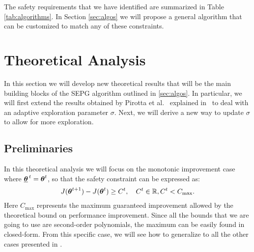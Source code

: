 \begin{samepage}
\begin{table}
	\caption{Overview of the safety requirements outlined in Section \ref{sec:framework}.}\label{tab:algorithms}
\end{table}

The safety requirements that we have identified are summarized in Table \ref{tab:algorithms}. In 
Section \ref{sec:algos} we will propose a general algorithm that can be customized to match any of these constraints.
\end{samepage}

\section{Theoretical Analysis}\label{sec:theory}
In this section we will develop new theoretical results that will be the main building blocks of the SEPG algorithm outlined in \ref{sec:algos}. In particular, we will first extend the results obtained by Pirotta et al.~\cite{adaptive_step} explained in~ to deal with an adaptive exploration parameter $\sigma$. Next, we will derive a new way to update $\sigma$ to allow for more exploration. 

\subsection{Preliminaries}

In this theoretical analysis we will focus on the monotonic improvement case where ${\underline{{\boldsymbol{\theta}}}^{\,t}}={\boldsymbol{\theta}}^t$, so that the safety constraint can be expressed as:
%
\begin{align*}
J({\boldsymbol{\theta}}^{t+1}) - J({\boldsymbol{\theta}}^t) \geq C^t, \quad C^t \in \mathbb{R}, C^t < C_{\text{max}}.
\end{align*}
Here $C_\text{max}$ represents the maximum guaranteed improvement allowed by the theoretical bound on performance improvement. Since all the bounds that we are going to use are second-order polynomials, the maximum can be easily found in closed-form. From this specific case, we will see how to generalize to all the other cases presented in .

